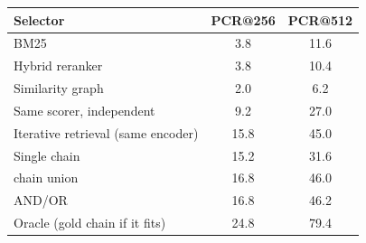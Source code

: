 \begin{tabular}{@{}lcc@{}}
\toprule
Selector & PCR@256 & PCR@512 \\
\midrule
BM25 & 3.8 & 11.6 \\
Hybrid reranker & 3.8 & 10.4 \\
Similarity graph & 2.0 & 6.2 \\
Same scorer, independent & 9.2 & 27.0 \\
Iterative retrieval (same encoder) & 15.8 & 45.0 \\
Single chain & 15.2 & 31.6 \\
\proofkv{} chain union & 16.8 & 46.0 \\
\proofkv{} AND/OR & 16.8 & 46.2 \\
Oracle (gold chain if it fits) & 24.8 & 79.4 \\
\bottomrule
\end{tabular}
